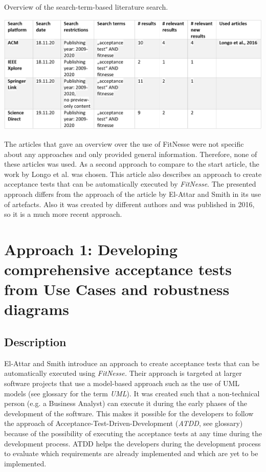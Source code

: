 \begin{table}[H]
	\caption{Overview of the search-term-based literature search.}
	
	\includegraphics[width=\textwidth]{../images/LitSearchFitnesse.png} 
	
	\label{fig:lit-search-fitnesse}
\end{table}


The articles that gave an overview over the use of FitNesse were not specific about any approaches and only provided general information.
Therefore, none of these articles was used.
As a second approach to compare to the start article, the work by Longo et al. \cite{longo} was chosen.
This article also describes an approach to create acceptance tests that can be automatically executed by \textit{FitNesse}.
The presented approach differs from the approach of the article by El-Attar and Smith in its use of artefacts.
Also it was created by different authors and was published in 2016, so it is a much more recent approach.


\section{Approach 1: Developing comprehensive acceptance tests from Use Cases and robustness diagrams}
\label{sec:el-attar}

\subsection{Description}

El-Attar and Smith \cite{el-attar} introduce an approach to create acceptance tests that can be automatically executed using \textit{FitNesse.}
Their approach is targeted at larger software projects that use a model-based approach such as the use of UML models (see glossary for the term \textit{UML}). 
It was created such that a non-technical person (e.g. a Business Analyst) can execute it during the early phases of the development of the software.
This makes it possible for the developers to follow the approach of Acceptance-Test-Driven-Development (\textit{ATDD}, see glossary) because of the possibility of executing the acceptance tests at any time during the development process.
ATDD helps the developers during the development process to evaluate which requirements are already implemented and  which are yet to be implemented.

